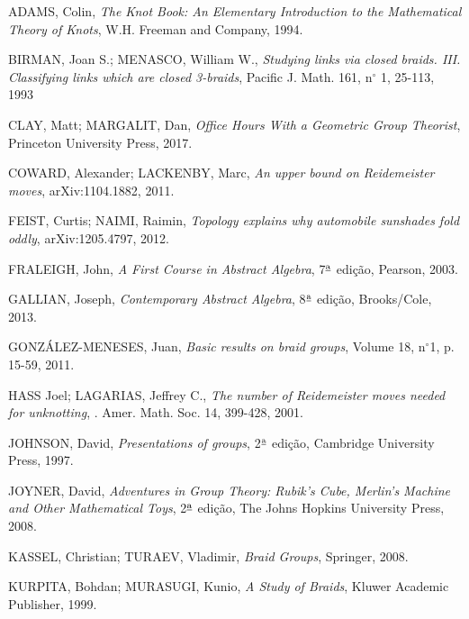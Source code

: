 \documentclass[a4paper,portuguese,11pt,twoside, leqno]{book}
\newcounter{braid}
\theoremstyle{definition}
\begin{document}
	
	
	\begin{thebibliography}{99}
		ADAMS, Colin, \textit{The Knot Book: An Elementary Introduction to the Mathematical Theory of Knots}, W.H. Freeman and Company, 1994.
		
		BIRMAN, Joan S.; MENASCO, William W., \textit{Studying links via closed braids. III. Classifying links which are closed 3-braids}, Pacific J. Math. 161, n$^\circ$ 1, 25-113, 1993
		
		CLAY, Matt; MARGALIT, Dan, \textit{Office Hours With a Geometric Group Theorist}, Princeton University Press, 2017.
		
		COWARD, Alexander; LACKENBY, Marc, \textit{An upper bound on Reidemeister moves}, arXiv:1104.1882, 2011.
		
		FEIST, Curtis; NAIMI, Raimin, \textit{Topology explains why automobile sunshades fold oddly}, arXiv:1205.4797, 2012.
		
		FRALEIGH, John, \textit{A First Course in Abstract Algebra}, 7$^{\text{\underline{a}}}$ edição, Pearson, 2003.
		
		GALLIAN, Joseph, \textit{Contemporary Abstract Algebra}, 8$^{\text{\underline{a}}}$ edição, Brooks/Cole, 2013.
		
		GONZÁLEZ-MENESES, Juan,	\textit{Basic results on braid groups}, Volume 18, n$^\circ$1, p. 15-59, 2011.
		
		HASS Joel; LAGARIAS, Jeffrey C., \textit{The number of Reidemeister moves needed for unknotting}, . Amer. Math. Soc. 14, 399-428, 2001.
		
		JOHNSON, David, \textit{Presentations of groups}, 2$^{\text{\underline{a}}}$ edição, Cambridge University Press, 1997. 
		
		JOYNER, David, \textit{Adventures in Group Theory: Rubik's Cube, Merlin's Machine and Other Mathematical Toys}, 2$^{\text{\underline{a}}}$ edição, The Johns Hopkins University Press, 2008.
		
		KASSEL, Christian; TURAEV, Vladimir,  \textit{Braid Groups}, Springer, 2008.
		
		KURPITA, Bohdan; MURASUGI, Kunio, \textit{A Study of Braids}, Kluwer Academic Publisher, 1999.
		

\end{thebibliography}
\end{document}
